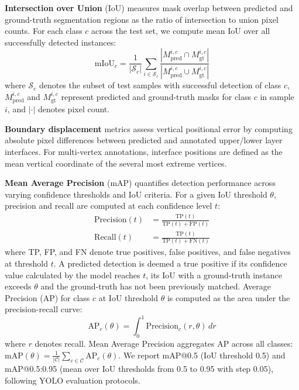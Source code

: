 \textbf{Intersection over Union} (IoU) measures mask overlap between predicted and ground-truth segmentation regions as the ratio of intersection to union pixel counts. For each class $c$ across the test set, we compute mean IoU over all successfully detected instances:
\begin{equation}
\text{mIoU}_c = \frac{1}{|\mathcal{S}_c|} \sum_{i \in \mathcal{S}_c} \frac{|M_{\text{pred}}^{i,c} \cap M_{\text{gt}}^{i,c}|}{|M_{\text{pred}}^{i,c} \cup M_{\text{gt}}^{i,c}|}
\end{equation}
where $\mathcal{S}_c$ denotes the subset of test samples with successful detection of class $c$, $M_{\text{pred}}^{i,c}$ and $M_{\text{gt}}^{i,c}$ represent predicted and ground-truth masks for class $c$ in sample $i$, and $|\cdot|$ denotes pixel count. 

\textbf{Boundary displacement} metrics assess vertical positional error by computing absolute pixel differences between predicted and annotated upper/lower layer interfaces. For multi-vertex annotations, interface positions are defined as the mean vertical coordinate of the several most extreme vertices.

\textbf{Mean Average Precision} (mAP) quantifies detection performance across varying confidence thresholds and IoU criteria. For a given IoU threshold $\theta$, precision and recall are computed at each confidence level $t$:
\begin{equation}
\begin{aligned}
\text{Precision}(t) &= \frac{\text{TP}(t)}{\text{TP}(t) + \text{FP}(t)} \\
\text{Recall}(t) &= \frac{\text{TP}(t)}{\text{TP}(t) + \text{FN}(t)}
\end{aligned}
\end{equation}
where TP, FP, and FN denote true positives, false positives, and false negatives at threshold $t$. A predicted detection is deemed a true positive if its confidence value calculated by the model reaches $t$, its IoU with a ground-truth instance exceeds $\theta$ and the ground-truth has not been previously matched. Average Precision (AP) for class $c$ at IoU threshold $\theta$ is computed as the area under the precision-recall curve:
\begin{equation}
\text{AP}_c(\theta) = \int_{0}^{1} \text{Precision}_c(r, \theta) \, dr
\end{equation}
where $r$ denotes recall. Mean Average Precision aggregates AP across all classes: $\text{mAP}(\theta) = \frac{1}{|\mathcal{C}|} \sum_{c \in \mathcal{C}} \text{AP}_c(\theta)$. We report mAP@0.5 (IoU threshold 0.5) and mAP@0.5:0.95 (mean over IoU thresholds from 0.5 to 0.95 with step 0.05), following YOLO evaluation protocols.

